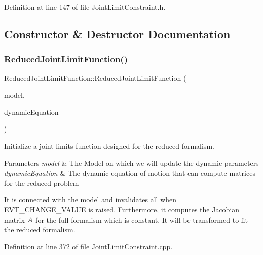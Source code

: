Definition at line 147 of file Joint\+Limit\+Constraint.\+h.



\subsection{Constructor \& Destructor Documentation}
\hypertarget{classocra_1_1ReducedJointLimitFunction_afe65f4b9229680de647bb06fd7ae5b44}{}\label{classocra_1_1ReducedJointLimitFunction_afe65f4b9229680de647bb06fd7ae5b44} 
\subsubsection{\texorpdfstring{Reduced\+Joint\+Limit\+Function()}{ReducedJointLimitFunction()}}
{\footnotesize\ttfamily Reduced\+Joint\+Limit\+Function\+::\+Reduced\+Joint\+Limit\+Function (\begin{DoxyParamCaption}\item[{const Model \&}]{model,  }\item[{const \hyperlink{classocra_1_1FullDynamicEquationFunction}{Full\+Dynamic\+Equation\+Function} \&}]{dynamic\+Equation }\end{DoxyParamCaption})}

Initialize a joint limits function designed for the reduced formalism.


\begin{DoxyParams}{Parameters}
{\em model} & The Model on which we will update the dynamic parameters \\
\hline
{\em dynamic\+Equation} & The dynamic equation of motion that can compute matrices for the reduced problem\\
\hline
\end{DoxyParams}
It is connected with the model and invalidates all when E\+V\+T\+\_\+\+C\+H\+A\+N\+G\+E\+\_\+\+V\+A\+L\+UE is raised. Furthermore, it computes the Jacobian matrix $ A $ for the full formalism which is constant. It will be transformed to fit the reduced formalism. 

Definition at line 372 of file Joint\+Limit\+Constraint.\+cpp.

\hypertarget{classocra_1_1ReducedJointLimitFunction_a96e9196a18c5eb5e92672b45a7491c65}{}\label{classocra_1_1ReducedJointLimitFunction_a96e9196a18c5eb5e92672b45a7491c65} 
